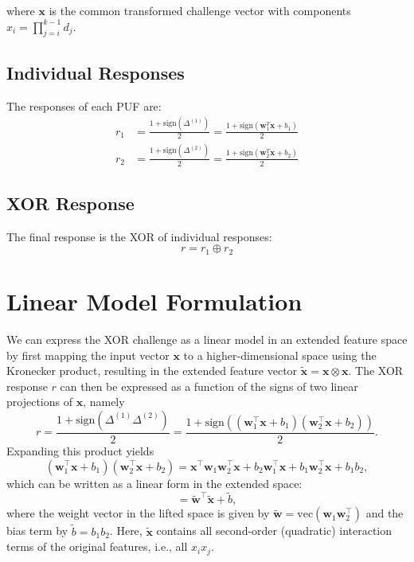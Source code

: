 \documentclass[11pt]{article}
\begin{document}
where $\mathbf{x}$ is the common transformed challenge vector with components $x_i = \prod_{j=i}^{k-1} d_j$.

\subsection{Individual Responses}

The responses of each PUF are:
\begin{align*}
r_1 &= \frac{1 + \text{sign}(\Delta^{(1)})}{2} = \frac{1 + \text{sign}(\mathbf{w}_1^T\mathbf{x} + b_1)}{2} \\
r_2 &= \frac{1 + \text{sign}(\Delta^{(2)})}{2} = \frac{1 + \text{sign}(\mathbf{w}_2^T\mathbf{x} + b_2)}{2}
\end{align*}

\subsection{XOR Response}

The final response is the XOR of individual responses:
\begin{equation*}
r = r_1 \oplus r_2
\end{equation*}
\section*{Linear Model Formulation}

We can express the XOR challenge as a linear model in an extended feature space by first mapping the input vector \(\mathbf{x}\) to a higher-dimensional space using the Kronecker product, resulting in the extended feature vector \(\tilde{\mathbf{x}} = \mathbf{x} \otimes \mathbf{x}\). The XOR response \(r\) can then be expressed as a function of the signs of two linear projections of \(\mathbf{x}\), namely
\[
r = \frac{1 + \text{sign}(\Delta^{(1)}\Delta^{(2)})}{2} = \frac{1 + \text{sign}\left((\mathbf{w}_1^\top \mathbf{x} + b_1)(\mathbf{w}_2^\top \mathbf{x} + b_2)\right)}{2}.
\]
Expanding this product yields
\[
(\mathbf{w}_1^\top \mathbf{x} + b_1)(\mathbf{w}_2^\top \mathbf{x} + b_2) = \mathbf{x}^\top \mathbf{w}_1 \mathbf{w}_2^\top \mathbf{x} + b_2 \mathbf{w}_1^\top \mathbf{x} + b_1 \mathbf{w}_2^\top \mathbf{x} + b_1 b_2,
\]
which can be written as a linear form in the extended space:
\[
= \tilde{\mathbf{w}}^\top \tilde{\mathbf{x}} + \tilde{b},
\]
where the weight vector in the lifted space is given by \(\tilde{\mathbf{w}} = \text{vec}(\mathbf{w}_1 \mathbf{w}_2^\top)\) and the bias term by \(\tilde{b} = b_1 b_2\). Here, \(\tilde{\mathbf{x}}\) contains all second-order (quadratic) interaction terms of the original features, i.e., all \(x_i x_j\).
\end{document}

